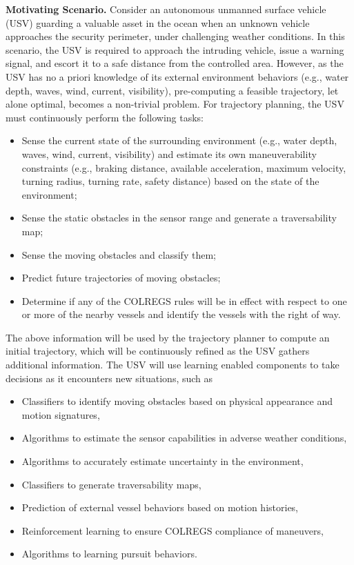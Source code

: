\documentclass[12pt]{dod-blank}
\begin{document}
\textbf{Motivating Scenario.} Consider an autonomous unmanned surface vehicle (USV) guarding a valuable asset in the ocean when an unknown vehicle  approaches the security perimeter, under challenging weather conditions. In this scenario, the USV is required to approach the intruding vehicle, issue a warning signal, and escort it to a safe distance from the controlled area. However, as the USV has no a priori knowledge of its external environment behaviors (e.g., water depth, waves, wind, current, visibility), pre-computing a feasible trajectory, let alone optimal, becomes a non-trivial problem. For trajectory planning, the USV must continuously perform the following tasks:
\begin{itemize}[itemsep=0pt,leftmargin=*]
 \item Sense the current state of the surrounding environment (e.g., water depth, waves, wind, current, visibility) and estimate its own maneuverability constraints (e.g., braking distance, available acceleration, maximum velocity, turning radius, turning rate, safety distance) based on the state of the environment;      
\item Sense the static obstacles in the sensor range and generate a traversability map;
\item Sense the moving obstacles and classify them;   
\item Predict future trajectories of moving obstacles; 
\item Determine if any of the COLREGS \cite{commandant1999international} rules will be in effect with respect to one or more of the nearby vessels and identify the vessels with the right of way.    
\end{itemize}
The above information will be used by the trajectory planner to compute an initial trajectory, which will be continuously refined as the USV gathers additional information.
The USV will use learning enabled components to take  decisions as it encounters new situations, such as  
\begin{itemize}[itemsep=0pt,leftmargin=*]
\item Classifiers to identify moving obstacles based on physical appearance and motion signatures,
\item Algorithms to estimate the sensor capabilities in adverse weather conditions,   
\item Algorithms to accurately estimate uncertainty in the environment, 
\item Classifiers to generate traversability maps,
\item Prediction of external vessel behaviors based on motion histories, 
\item Reinforcement learning  to ensure COLREGS compliance of maneuvers,  
\item Algorithms to learning pursuit behaviors.  
\end{itemize}
\end{document}
